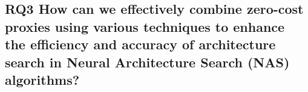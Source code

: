 \begin{comment}
\subsubsection{RQ3 How can we effectively combine zero-cost proxies using various techniques to enhance the efficiency and accuracy of architecture search in Neural Architecture Search (\gls{NAS}) algorithms?}


This study aimed to investigate the effectiveness of combining zero-cost proxies to improve the efficiency and accuracy of architecture search in Neural Architecture Search (\gls{NAS}) algorithms, as posed in Research Question 3. We observed an enhanced capacity for identifying superior-performing architectures compared to using individual zero-cost proxy metrics by employing the majority vote method and the weighted arithmetic mean method.

As detailed in the Results chapter, the majority vote method (\autoref{tab:vote}) demonstrates that some combinations of zero-cost proxy metrics exhibit a higher custom correlation measure (majority vote score). This indicates that these combinations perform similarly in terms of the agreement between the majority of metric differences and accuracy differences. For example, the highest majority vote score was 0.8009 when combining \gls{Synflow}, Zen, and Plain metrics.

The weighted arithmetic mean method also showed promise for improving the ranking of candidate architectures. The method assigned weights to zero-cost proxies based on their individual correlation with validation accuracy, as shown in \autoref{tab:corr}. Based on \autoref{fig:weighted}, there appears to be a positive correlation between the validation accuracy and the weighted arithmetic mean, as indicated by the upward slope of the best-fit line. This suggests that architectures with higher validation accuracy tend to have higher weighted arithmetic means. The Spearman's rank correlation coefficient of 0.796 supports this observation, implying a strong positive correlation between the two variables.
\end{comment}
\subsection{RQ3 How can we effectively combine zero-cost proxies using various techniques to enhance the efficiency and accuracy of architecture search in Neural Architecture Search (NAS) algorithms?}

